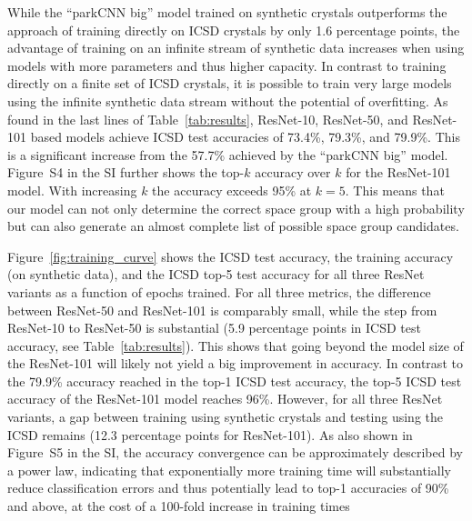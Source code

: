     While the ``parkCNN big'' model trained on synthetic crystals outperforms
    the approach of training directly on ICSD crystals by only 1.6 percentage
    points, the advantage of training on an infinite stream of synthetic data increases when using models with more parameters and thus higher capacity. In
    contrast to training directly on a finite set of ICSD crystals, it is possible to train
    very large models using the infinite synthetic data stream without the
    potential of overfitting. As found in the last lines of Table~\ref{tab:results}, ResNet-10, ResNet-50, and ResNet-101 based models achieve ICSD test accuracies of 73.4\%,
    79.3\%, and 79.9\%. This is a significant increase from the 57.7\% achieved
    by the ``parkCNN big'' model. Figure~S4 in the SI further shows the top-$k$ accuracy over $k$ for the ResNet-101 model. With increasing $k$ the accuracy exceeds 95\% at $k=5$.
    This means that our model can not only determine the correct space group with a high probability but can also generate an almost complete list of possible space group candidates.
    
    Figure~\ref{fig:training_curve} shows the ICSD test accuracy, the training
    accuracy (on synthetic data), and the ICSD top-5 test accuracy for all three ResNet variants
    as a function of epochs trained. For all three metrics, the difference
    between ResNet-50 and ResNet-101 is comparably small, while the step from
    ResNet-10 to ResNet-50 is substantial (5.9 percentage points in ICSD test
    accuracy, see Table~\ref{tab:results}). This shows that going beyond the
    model size of the ResNet-101 will likely not yield a big improvement in
    accuracy. In contrast to the 79.9\% accuracy reached in the top-1 ICSD test accuracy, the top-5 ICSD test accuracy of the ResNet-101 model reaches
    96\%. However, for all three ResNet variants, a gap between training using synthetic
    crystals and testing using the ICSD remains (12.3 percentage points for
    ResNet-101). As also shown in Figure~S5 in the SI, the accuracy convergence can be approximately described by a power law, indicating that exponentially more training time will substantially reduce classification errors and thus potentially lead to top-1 accuracies of 90\% and above, at the cost of a 100-fold increase in training times

